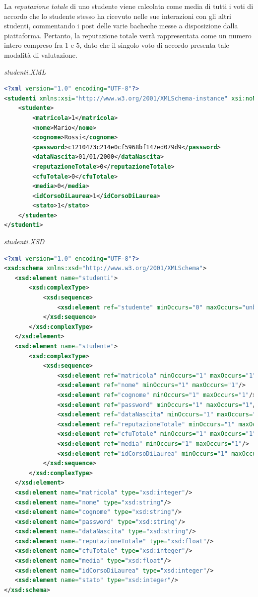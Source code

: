 \documentclass [a4paper,11pt]{book}
\begin{document}
La \emph{reputazione totale} di uno studente viene calcolata come media di tutti i voti di accordo che lo studente stesso ha ricevuto nelle sue interazioni con gli altri studenti, commentando i post delle varie bacheche messe a disposizione dalla piattaforma. Pertanto, la reputazione totale verrà rappresentata come un numero intero compreso fra 1 e 5, dato che il singolo voto di accordo presenta tale modalità di valutazione.

\medskip

\emph{studenti.XML}

\label{sec:studenti}

\begin{lstlisting}[language=XML]
<?xml version="1.0" encoding="UTF-8"?>
<studenti xmlns:xsi="http://www.w3.org/2001/XMLSchema-instance" xsi:noNamespaceSchemaLocation="studenti.xsd">
    <studente>
        <matricola>1</matricola>
        <nome>Mario</nome>
        <cognome>Rossi</cognome>
        <password>c1210473c214e0cf5968bf147ed079d9</password>
        <dataNascita>01/01/2000</dataNascita>
        <reputazioneTotale>0</reputazioneTotale>
        <cfuTotale>0</cfuTotale>
        <media>0</media>
        <idCorsoDiLaurea>1</idCorsoDiLaurea>
        <stato>1</stato>
    </studente>
</studenti>
\end{lstlisting}

\emph{studenti.XSD}

\begin{lstlisting}[language=XML]
<?xml version="1.0" encoding="UTF-8"?>
<xsd:schema xmlns:xsd="http://www.w3.org/2001/XMLSchema">
   <xsd:element name="studenti">
       <xsd:complexType>
           <xsd:sequence>
               <xsd:element ref="studente" minOccurs="0" maxOccurs="unbounded" />
           </xsd:sequence>
       </xsd:complexType>
   </xsd:element>
   <xsd:element name="studente">
       <xsd:complexType>
           <xsd:sequence>
               <xsd:element ref="matricola" minOccurs="1" maxOccurs="1"/>
               <xsd:element ref="nome" minOccurs="1" maxOccurs="1"/>
               <xsd:element ref="cognome" minOccurs="1" maxOccurs="1"/>
               <xsd:element ref="password" minOccurs="1" maxOccurs="1"/>
               <xsd:element ref="dataNascita" minOccurs="1" maxOccurs="1"/>
               <xsd:element ref="reputazioneTotale" minOccurs="1" maxOccurs="1"/>
               <xsd:element ref="cfuTotale" minOccurs="1" maxOccurs="1"/>
               <xsd:element ref="media" minOccurs="1" maxOccurs="1"/>
               <xsd:element ref="idCorsoDiLaurea" minOccurs="1" maxOccurs="1"/>
           </xsd:sequence>
       </xsd:complexType>
   </xsd:element>
   <xsd:element name="matricola" type="xsd:integer"/>
   <xsd:element name="nome" type="xsd:string"/>
   <xsd:element name="cognome" type="xsd:string"/>
   <xsd:element name="password" type="xsd:string"/>
   <xsd:element name="dataNascita" type="xsd:string"/>
   <xsd:element name="reputazioneTotale" type="xsd:float"/>
   <xsd:element name="cfuTotale" type="xsd:integer"/>
   <xsd:element name="media" type="xsd:float"/>
   <xsd:element name="idCorsoDiLaurea" type="xsd:integer"/>
   <xsd:element name="stato" type="xsd:integer"/>
</xsd:schema>
\end{lstlisting}
\end{document}
